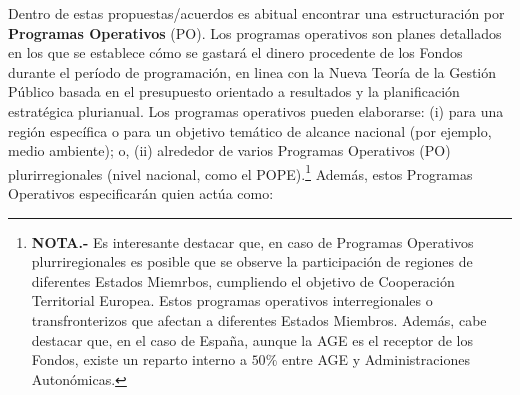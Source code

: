 \documentclass[10pt,a4paper]{article}
\begin{document}
Dentro de estas propuestas/acuerdos es abitual encontrar una estructuración por \textbf{Programas Operativos} (PO). Los programas operativos son planes detallados en los que se establece cómo se gastará el dinero procedente de los Fondos durante el período de programación, en linea con la Nueva Teoría de la Gestión Público basada en el presupuesto orientado a resultados y la planificación estratégica plurianual.  Los programas operativos pueden elaborarse: (i) para una región específica o para un objetivo temático de alcance nacional (por ejemplo, medio ambiente); o, (ii) alrededor de varios Programas Operativos (PO) plurirregionales (nivel nacional, como el POPE).\footnote{%
    \textbf{NOTA.-} Es interesante destacar que, en caso de Programas Operativos plurriregionales es posible que se observe la participación de regiones de diferentes Estados Miemrbos, cumpliendo el objetivo de Cooperación Territorial Europea. Estos programas operativos interregionales o transfronterizos que afectan a diferentes Estados Miembros. Además, cabe destacar que, en el caso de España, aunque la AGE es el receptor de los Fondos, existe un reparto interno a $50\%$ entre AGE y Administraciones Autonómicas.
} Además, estos Programas Operativos especificarán quien actúa como:
\end{document}
